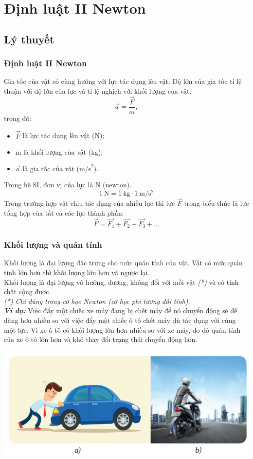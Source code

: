 \let\lesson\undefined
\newcommand{\lesson}{\phantomlesson{Bài 11: Ba định luật Newton về chuyển động}}
\chapter[Định luật II Newton]{Định luật II Newton}
\setcounter{section}{0}
\section{Lý thuyết}
\subsection{Định luật II Newton}
Gia tốc của vật có cùng hướng với lực tác dụng lên vật. Độ lớn của gia tốc tỉ lệ thuận với độ lớn của lực và tỉ lệ nghịch với khối lượng của vật.
\begin{equation*}
	\vec{a}=\dfrac{\vec F}{m},
\end{equation*}
trong đó:
\begin{itemize}
	\item $\vec F$ là lực tác dụng lên vật (N);
	\item m là khối lượng của vật (kg);
	\item $\vec a$ là gia tốc của vật ($\text{m/s}^2$).
\end{itemize}
Trong hệ SI, đơn vị của lực là $\si{\newton}$ (newton).\\
$$\SI{1}{\newton}=\SI{1}{\kilogram}\cdot\SI{1}{\meter/\second^2}$$
Trong trường hợp vật chịu tác dụng của nhiều lực thì lực $\vec{F}$ trong biểu thức là lực tổng hợp của tất cả các lực thành phần:
$$\vec{F}=\overrightarrow{F_1}+\overrightarrow{F_2}+\overrightarrow{F_3}+\dots$$
\subsection{Khối lượng và quán tính}
Khối lượng là đại lượng đặc trưng cho mức quán tính của vật. Vật có mức quán tính lớn hơn thì khối lượng lớn hơn và ngược lại. \\
Khối lượng là đại lượng vô hướng, dương, không đổi với mỗi vật \textit{(*)} và có tính chất cộng được.\\
\textit{(*) Chỉ đúng trong cơ học Newton (cơ học phi tương đối tính).}\\
\textbf{\textit{Ví dụ:}} Việc đẩy một chiếc xe máy đang bị chết máy để nó chuyển động sẽ dễ dàng hơn nhiều so với việc đẩy một chiếc ô tô chết máy dù tác dụng với cùng một lực. Vì xe ô tô có khối lượng lớn hơn nhiều so với xe máy, do đó quán tính của xe ô tô lớn hơn và khó thay đổi trạng thái chuyển động hơn.
\begin{center}
	\includegraphics[width=0.5\linewidth]{../figs/VN10-2023-PH-TP016-1}
\end{center}
